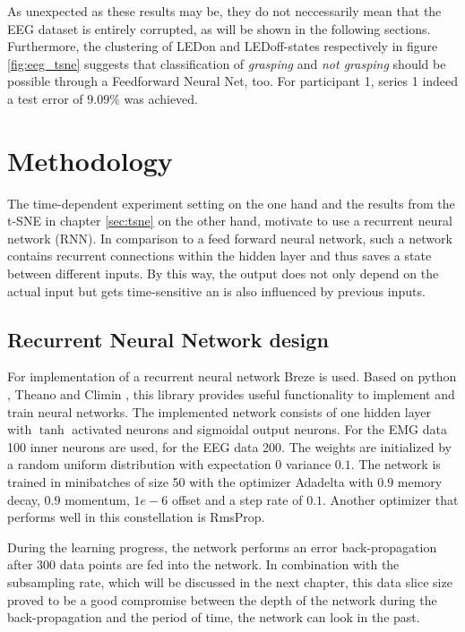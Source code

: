 \documentclass{article} %
\begin{document}
As unexpected as these results may be, they do not neccessarily mean that the EEG dataset is entirely corrupted, as will be shown in the following sections. Furthermore, the clustering of LEDon and LEDoff-states respectively in figure \ref{fig:eeg_tsne} suggests that classification of \emph{grasping} and \emph{not grasping} should be possible through a Feedforward Neural Net, too. For participant 1, series 1 indeed a test error of $9.09\%$ was achieved.  

\section{Methodology}
The time-dependent experiment setting on the one hand and the results from the t-SNE in chapter \ref{sec:tsne} on the other hand, motivate to use a recurrent neural network (RNN).
In comparison to a feed forward neural network, such a network contains recurrent connections within the hidden layer and thus saves a state between different inputs.
By this way, the output does not only depend on the actual input but gets time-sensitive an is also influenced by previous inputs.

\subsection{Recurrent Neural Network design}
For implementation of a recurrent neural network Breze \cite{breze} is used.
Based on python \cite{python}, Theano \cite{theano} and Climin \cite{climin}, this library provides useful functionality to implement and train neural networks.
The implemented network consists of one hidden layer with $\tanh$ activated neurons and sigmoidal output neurons.
For the EMG data 100 inner neurons are used, for the EEG data 200.
The weights are initialized by a random uniform distribution with expectation $0$ variance $0.1$.
The network is trained in minibatches of size 50 with the optimizer Adadelta with $0.9$ memory decay, $0.9$ momentum, $1e-6$ offset and a step rate of $0.1$.
Another optimizer that performs well in this constellation is RmsProp.

During the learning progress, the network performs an error back-propagation after $300$ data points are fed into the network.
In combination with the subsampling rate, which will be discussed in the next chapter, this data slice size proved to be a good compromise between the depth of the network during the back-propagation and the period of time, the network can look in the past.
\end{document}
